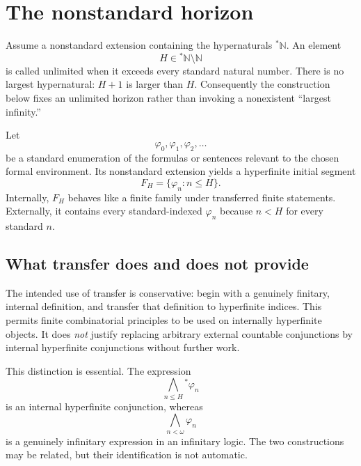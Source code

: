 \documentclass[11pt]{article}
\begin{document}
\section{The nonstandard horizon}

Assume a nonstandard extension containing the hypernaturals ${}^*\mathbb N$. An element
\begin{equation}
H\in{}^*\mathbb N\setminus\mathbb N
\end{equation}
is called unlimited when it exceeds every standard natural number. There is no largest hypernatural: $H+1$ is larger than $H$. Consequently the construction below fixes an unlimited horizon rather than invoking a nonexistent ``largest infinity.''

Let
\begin{equation}
\varphi_0,\varphi_1,\varphi_2,\ldots
\end{equation}
be a standard enumeration of the formulas or sentences relevant to the chosen formal environment. Its nonstandard extension yields a hyperfinite initial segment
\begin{equation}
F_H=\{\varphi_n:n\le H\}.
\label{eq:FH}
\end{equation}
Internally, $F_H$ behaves like a finite family under transferred finite statements. Externally, it contains every standard-indexed $\varphi_n$ because $n<H$ for every standard $n$.

\subsection{What transfer does and does not provide}

The intended use of transfer is conservative: begin with a genuinely finitary, internal definition, and transfer that definition to hyperfinite indices. This permits finite combinatorial principles to be used on internally hyperfinite objects. It does \emph{not} justify replacing arbitrary external countable conjunctions by internal hyperfinite conjunctions without further work.

This distinction is essential. The expression
\begin{equation}
\bigwedge_{n\le H}{}^*\varphi_n
\end{equation}
is an internal hyperfinite conjunction, whereas
\begin{equation}
\bigwedge_{n<\omega}\varphi_n
\end{equation}
is a genuinely infinitary expression in an infinitary logic. The two constructions may be related, but their identification is not automatic.
\end{document}
